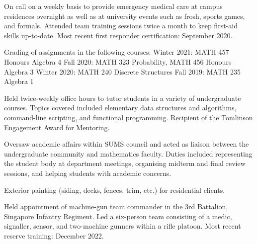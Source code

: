 \smallskip
On call on a weekly basis to provide emergency medical care at campus residences overnight as well as at
university events such as frosh, sports games, and formals. Attended team training sessions twice a month to keep
first-aid skills up-to-date. Most recent first responder certification: September 2020.
\medbreak

\smallskip
Grading of assignments in the following courses:
\begingroup\parindent=10pt
\smallskip
\thing Winter 2021: MATH 457 Honours Algebra 4
\smallskip
\thing Fall 2020: MATH 323 Probability, MATH 456 Honours Algebra 3
\smallskip
\thing Winter 2020: MATH 240 Discrete Structures
\smallskip
\thing Fall 2019: MATH 235 Algebra 1
\endgroup
\medbreak

\smallskip
Held twice-weekly office hours to tutor students in a variety of undergraduate courses.
Topics covered included elementary data structures and algorithms, command-line scripting,
and functional programming. Recipient of the Tomlinson Engagement Award for Mentoring.
\medbreak

\smallskip
Oversaw academic affairs within SUMS council and acted as liaison between the undergraduate community and
mathematics faculty. Duties included representing the student body at department meetings,
organising midterm and final review sessions,
and helping students with
academic concerns.
\medbreak

\smallskip
Exterior painting (siding, decks, fences, trim, etc.) for residential clients.
\medbreak

\smallskip
Held appointment of machine-gun team commander in the 3rd Battalion, Singapore Infantry Regiment.
Led a six-person team consisting of a medic, signaller, sensor, and two-machine gunners within a rifle platoon.
Most recent reserve training: December 2022.
\medbreak

